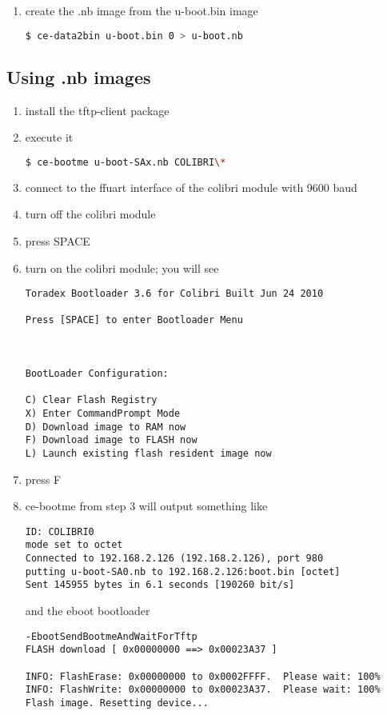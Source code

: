 \begin{enumerate}
\item create the .nb image from the u-boot.bin image
\begin{lstlisting}[language=sh]
$ ce-data2bin u-boot.bin 0 > u-boot.nb
\end{lstlisting}%
\end{enumerate}


\subsection{Using .nb images}

\begin{enumerate}
\item install the tftp-client package
\item execute it
\begin{lstlisting}[language=sh]
$ ce-bootme u-boot-SAx.nb COLIBRI\*
\end{lstlisting}%

\item connect to the ffuart interface of the colibri module with 9600 baud

\item turn off the colibri module

\item press SPACE

\item turn on the colibri module; you will see

\begin{verbatim}
Toradex Bootloader 3.6 for Colibri Built Jun 24 2010

Press [SPACE] to enter Bootloader Menu



BootLoader Configuration:

C) Clear Flash Registry
X) Enter CommandPrompt Mode
D) Download image to RAM now
F) Download image to FLASH now
L) Launch existing flash resident image now
\end{verbatim}

\item press F

\item ce-bootme from step 3 will output something like
\begin{verbatim}
ID: COLIBRI0
mode set to octet
Connected to 192.168.2.126 (192.168.2.126), port 980
putting u-boot-SA0.nb to 192.168.2.126:boot.bin [octet]
Sent 145955 bytes in 6.1 seconds [190260 bit/s]
\end{verbatim}

     and the eboot bootloader

\begin{verbatim}
-EbootSendBootmeAndWaitForTftp
FLASH download [ 0x00000000 ==> 0x00023A37 ]

INFO: FlashErase: 0x00000000 to 0x0002FFFF.  Please wait: 100%
INFO: FlashWrite: 0x00000000 to 0x00023A37.  Please wait: 100%
Flash image. Resetting device...
\end{verbatim}

\end{enumerate}


